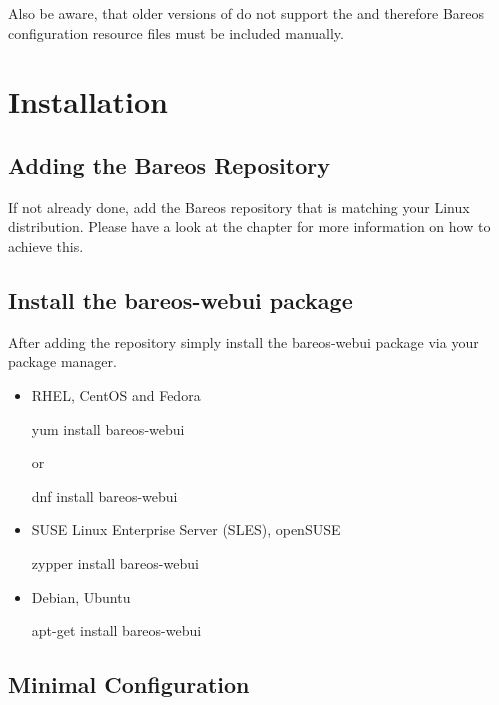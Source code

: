 Also be aware, that older versions of \bareosDir do not support the 
and therefore Bareos configuration resource files must be included manually.

\section{Installation}

\subsection{Adding the Bareos Repository}

If not already done, add the Bareos repository that is matching your Linux distribution. Please have a look at the chapter  for more information on how to achieve this.

\subsection{Install the bareos-webui package}

After adding the repository simply install the bareos-webui package via your package manager.

\begin{itemize}
 \item RHEL, CentOS and Fedora
\begin{commands}{}
yum install bareos-webui
\end{commands}
 or
\begin{commands}{}
dnf install bareos-webui
\end{commands}
\end{itemize}

\begin{itemize}
 \item SUSE Linux Enterprise Server (SLES), openSUSE
\begin{commands}{}
zypper install bareos-webui
\end{commands}
\end{itemize}

\begin{itemize}
 \item Debian, Ubuntu
\begin{commands}{}
apt-get install bareos-webui
\end{commands}
\end{itemize}

\subsection{Minimal Configuration}


